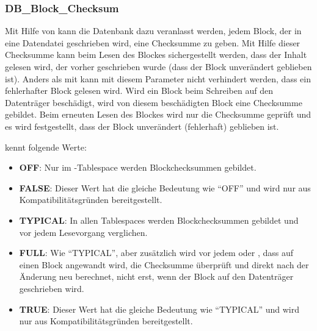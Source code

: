         \subsubsection{DB\_Block\_Checksum}
          Mit Hilfe von  kann die Datenbank dazu veranlasst werden, jedem Block, der in eine Datendatei geschrieben wird, eine Checksumme zu geben. Mit Hilfe dieser Checksumme kann beim Lesen des Blockes sichergestellt werden, dass der Inhalt gelesen wird, der vorher geschrieben wurde (dass der Block unver\"andert geblieben ist).
\clearpage
          Anders als mit  kann mit diesem Parameter nicht verhindert werden, dass ein fehlerhafter Block gelesen wird. Wird ein Block beim Schreiben auf den Datentr\"ager besch\"adigt, wird von diesem besch\"adigten Block eine Checksumme gebildet. Beim erneuten Lesen des Blockes wird nur die Checksumme gepr\"uft und es wird festgestellt, dass der Block unver\"andert (fehlerhaft) geblieben ist.

           kennt folgende Werte:
          \begin{itemize}
            \item \textbf{OFF}: Nur im -Tablespace werden Blockchecksummen gebildet.
            \item \textbf{FALSE}: Dieser Wert hat die gleiche Bedeutung wie \enquote{OFF} und wird nur aus Kompatibilit\"atsgr\"unden bereitgestellt.
            \item \textbf{TYPICAL}: In allen Tablespaces werden Blockchecksummen gebildet und vor jedem Lesevorgang verglichen.
            \item \textbf{FULL}: Wie \enquote{TYPICAL}, aber zus\"atzlich wird vor jedem  oder , dass auf einen Block angewandt wird, die Checksumme \"uberpr\"uft und direkt nach der \"Anderung neu berechnet, nicht erst, wenn der Block auf den Datentr\"ager geschrieben wird.
            \item \textbf{TRUE}: Dieser Wert hat die gleiche Bedeutung wie \enquote{TYPICAL} und wird nur aus Kompatibilit\"atsgr\"unden bereitgestellt.
          \end{itemize}

